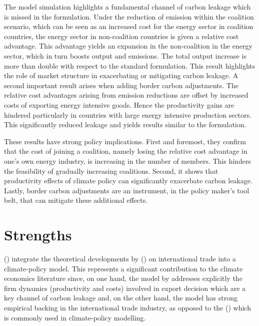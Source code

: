 \documentclass[american]{scrartcl}
\newcommand{\citein}[1]{\citeauthor{#1} (\citeyear{#1})}
\begin{document}
The model simulation highlights a fundamental channel of carbon leakage which is missed in the \citeauthor{Armington1969} formulation. Under the reduction of emission within the coalition scenario, which can be seen as an increased cost for the energy sector in coalition countries, the energy sector in non-coalition countries is given a relative cost advantage. This advantage yields an expansion in the non-coalition in the energy sector, which in turn boosts output and emissions. The total output increase is more than double with respect to the standard \citeauthor{Armington1969} formulation. This result highlights the role of market structure in exacerbating or mitigating carbon leakage. A second important result arises when adding border carbon adjustments. The relative cost advantages arising from emission reductions are offset by increased costs of exporting energy intensive goods. Hence the productivity gains are hindered particularly in countries with large energy intensive production sectors. This significantly reduced leakage and yields results similar to the \citeauthor{Armington1969} formulation.

These results have strong policy implications. First and foremost, they confirm that the cost of joining a coalition, namely losing the relative cost advantage in one's own energy industry, is increasing in the number of members. This hinders the feasibility of gradually increasing coalitions. Second, it shows that productivity effects of climate policy can significantly exacerbate carbon leakage. Lastly, border carbon adjustments are an instrument, in the policy maker's tool belt, that can mitigate these additional effects.

\section{Strengths}

\citein{Balistreri2012} integrate the theoretical developments by \citein{Melitz2003} on international trade into a climate-policy model. This represents a significant contribution to the climate economics literature since, on one hand, the model by \citeauthor{Melitz2003} addresses explicitly the firm dynamics (productivity and costs) involved in export decision which are a key channel of carbon leakage and, on the other hand, the model has strong empirical backing in the international trade industry, as opposed to the \citein{Armington1969} which is commonly used in climate-policy modelling.
\end{document}
